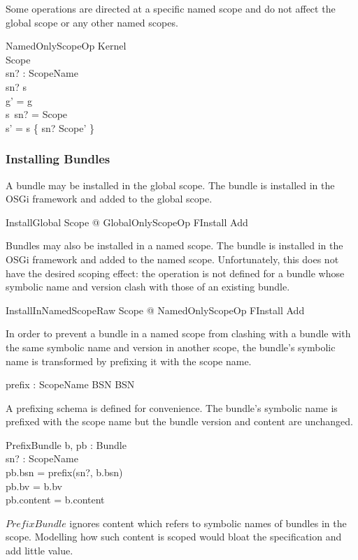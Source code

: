 \documentclass[a4paper,12pt]{article}
\begin{document}
Some operations are directed at a specific named scope and do not affect the global scope
or any other named scopes.
\begin{schema}{NamedOnlyScopeOp}
\Delta Kernel \\
\Delta Scope \\
sn? : ScopeName \\
\where
sn? \in \dom s \\
g' = g \\
s~sn? = \theta Scope \\
s' = s \oplus \{ sn? \mapsto \theta Scope' \} \\
\end{schema}

\subsubsection{Installing Bundles}

A bundle may be installed in the global scope. The bundle is installed in the OSGi framework and added to
the global scope.
\begin{zed}
InstallGlobal  \exists \Delta Scope @ GlobalOnlyScopeOp \land FInstall \land Add \\
\end{zed}

Bundles may also be installed in a named scope.
The bundle is installed in the OSGi framework and added to the named scope.
Unfortunately, this does not have the desired scoping effect: the operation is not defined for a bundle
whose symbolic name and version clash with those of an existing bundle.
\begin{zed}
InstallInNamedScopeRaw  \exists \Delta Scope @ NamedOnlyScopeOp \land FInstall \land Add \\
\end{zed}

In order to prevent a bundle in a named scope from clashing with a bundle with the same symbolic name
and version in another scope, the bundle's symbolic name is transformed by prefixing it with the scope name.
\begin{axdef}
prefix : ScopeName \cross BSN \inj BSN \\
\end{axdef}

A prefixing schema is defined for convenience.
The bundle's symbolic name is prefixed with the scope name but the bundle version and content are
unchanged.
\begin{schema}{PrefixBundle}
b, pb : Bundle \\
sn? : ScopeName \\
\where
 pb.bsn = prefix(sn?, b.bsn) \\
 pb.bv = b.bv \\
 pb.content = b.content \\
\end{schema}
$PrefixBundle$ ignores content which refers to symbolic names of bundles in the scope.
Modelling how such content is scoped would bloat the specification and add little value.
\end{document}
